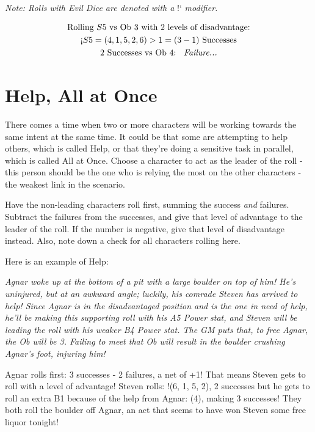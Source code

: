 \documentclass[../main.tex]{subfiles}
\begin{document}
        \emph{Note: Rolls with Evil Dice are denoted with a} !` \emph{modifier.}
        \\
        \begin{mdframed}[style=Arrata]
            \begin{equation*}
                \begin{gathered}
                    \text{Rolling $S5$ vs Ob 3 with 2 levels of disadvantage:}      \\
                    \text{!`}S5 = (4, 1, 5, 2, 6)>1 = (3 - 1) \text{ Successes}     \\
                    2 \text{ Successes vs Ob 4: \emph{ Failure...}}
                \end{gathered}
            \end{equation*}
        \end{mdframed}

    \section{Help, All at Once}

        There comes a time when two or more characters will be working towards the same intent at the same time. It could be that some are attempting to help others, which is called Help, or that they're doing a sensitive task in parallel, which is called All at Once. Choose a character to act as the leader of the roll - this person should be the one who is relying the most on the other characters - the weakest link in the scenario.

        Have the non-leading characters roll first, summing the success {\em and} failures. Subtract the failures from the successes, and give that level of advantage to the leader of the roll. If the number is negative, give that level of disadvantage instead. Also, note down a check for all characters rolling here.

        Here is an example of Help:

        \begin{displayquote}
            {\em Agnar woke up at the bottom of a pit with a large boulder on top of him! He's uninjured, but at an awkward angle; luckily, his comrade Steven has arrived to help! Since Agnar is in the disadvantaged position and is the one in need of help, he'll be making this supporting roll with his A5 Power stat, and Steven will be leading the roll with his weaker B4 Power stat. The GM puts that, to free Agnar, the Ob will be 3. Failing to meet that Ob will result in the boulder crushing Agnar's foot, injuring him!

            Agnar rolls first: 3 successes - 2 failures, a net of +1! That means Steven gets to roll with a level of advantage! Steven rolls: !(6, 1, 5, 2), 2 successes but he gets to roll an extra B1 because of the help from Agnar: (4), making 3 successes! They both roll the boulder off Agnar, an act that seems to have won Steven some free liquor tonight!}
        \end{displayquote}
\end{document}
